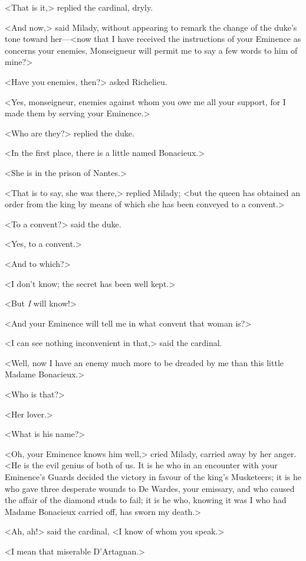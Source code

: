 <That is it,> replied the cardinal, dryly. 

<And now,> said Milady, without appearing to remark the change of the duke's tone toward her—<now that I have received the instructions of your Eminence as concerns your enemies, Monseigneur will permit me to say a few words to him of mine?> 

<Have you enemies, then?> asked Richelieu. 

<Yes, monseigneur, enemies against whom you owe me all your support, for I made them by serving your Eminence.> 

<Who are they?> replied the duke. 

<In the first place, there is a little  named Bonacieux.> 

<She is in the prison of Nantes.> 

<That is to say, she was there,> replied Milady; <but the queen has obtained an order from the king by means of which she has been conveyed to a convent.> 

<To a convent?> said the duke. 

<Yes, to a convent.> 

<And to which?> 

<I don't know; the secret has been well kept.> 

<But \emph{I} will know!> 

<And your Eminence will tell me in what convent that woman is?> 

<I can see nothing inconvenient in that,> said the cardinal. 

<Well, now I have an enemy much more to be dreaded by me than this little Madame Bonacieux.> 

<Who is that?> 

<Her lover.> 

<What is his name?> 

<Oh, your Eminence knows him well,> cried Milady, carried away by her anger. <He is the evil genius of both of us. It is he who in an encounter with your Eminence's Guards decided the victory in favour of the king's Musketeers; it is he who gave three desperate wounds to De Wardes, your emissary, and who caused the affair of the diamond studs to fail; it is he who, knowing it was I who had Madame Bonacieux carried off, has sworn my death.> 

<Ah, ah!> said the cardinal, <I know of whom you speak.> 

<I mean that miserable D'Artagnan.> 

